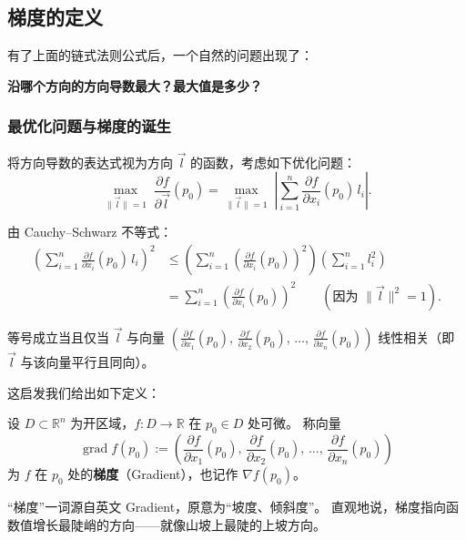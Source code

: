 \documentclass[lang=cn,11pt]{elegantbook}
\begin{document}
\subsection{梯度的定义}

有了上面的链式法则公式后，一个自然的问题出现了：

\textbf{沿哪个方向的方向导数最大？最大值是多少？}


\subsubsection*{最优化问题与梯度的诞生}

将方向导数的表达式视为方向 $\vec l$ 的函数，考虑如下优化问题：
\[
\max_{\|\vec l\|=1}\;\frac{\partial f}{\partial\vec l}(p_0)
 =\max_{\|\vec l\|=1}\;\left|
      \sum_{i=1}^{n}\frac{\partial f}{\partial x_i}(p_0)\,l_i
    \right|.
\]

由 Cauchy--Schwarz 不等式：
\begin{align*}
\left(\sum_{i=1}^{n}\frac{\partial f}{\partial x_i}(p_0)\,l_i\right)^{\!2}
&\leq
   \left(\sum_{i=1}^{n}\left(\frac{\partial f}{\partial x_i}(p_0)\right)^{\!2}\right)
   \left(\sum_{i=1}^{n}l_i^2\right)\\
&=
   \sum_{i=1}^{n}\left(\frac{\partial f}{\partial x_i}(p_0)\right)^{\!2}
   \qquad(\text{因为 }\|\vec l\|^2=1).
\end{align*}

等号成立当且仅当 $\vec l$ 与向量
$\displaystyle\left(
  \frac{\partial f}{\partial x_1}(p_0),\,
  \frac{\partial f}{\partial x_2}(p_0),\,
  \dots,\,
  \frac{\partial f}{\partial x_n}(p_0)
\right)$
线性相关（即 $\vec l$ 与该向量平行且同向）。

这启发我们给出如下定义：

\begin{definition}[梯度 / Gradient] \label{def:gradient}
设 $D\subset\mathbb R^n$ 为开区域，$f:D\to\mathbb R$ 在 $p_0\in D$ 处可微。
称向量
\[
\boxed{
\operatorname{grad}f(p_0)
:=\left(
     \frac{\partial f}{\partial x_1}(p_0),\,
     \frac{\partial f}{\partial x_2}(p_0),\,
     \dots,\,
     \frac{\partial f}{\partial x_n}(p_0)
   \right)}
\]
为 $f$ 在 $p_0$ 处的\textbf{梯度}（Gradient），也记作 $\nabla f(p_0)$。
\end{definition}

\begin{note}[名称来源]
“梯度”一词源自英文 Gradient，原意为“坡度、倾斜度”。
直观地说，梯度指向函数值增长最陡峭的方向——就像山坡上最陡的上坡方向。
\end{note}
\end{document}

